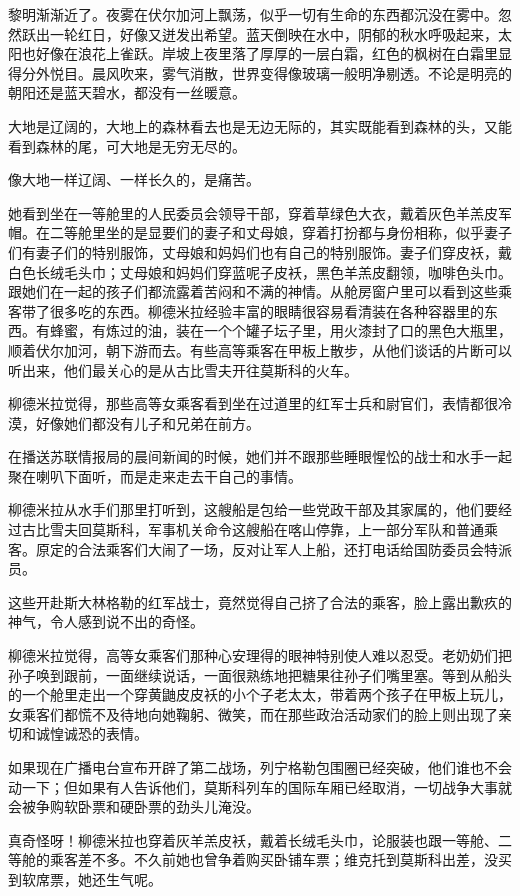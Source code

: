 黎明渐渐近了。夜雾在伏尔加河上飘荡，似乎一切有生命的东西都沉没在雾中。忽然跃出一轮红日，好像又迸发出希望。蓝天倒映在水中，阴郁的秋水呼吸起来，太阳也好像在浪花上雀跃。岸坡上夜里落了厚厚的一层白霜，红色的枫树在白霜里显得分外悦目。晨风吹来，雾气消散，世界变得像玻璃一般明净剔透。不论是明亮的朝阳还是蓝天碧水，都没有一丝暖意。

大地是辽阔的，大地上的森林看去也是无边无际的，其实既能看到森林的头，又能看到森林的尾，可大地是无穷无尽的。

像大地一样辽阔、一样长久的，是痛苦。

她看到坐在一等舱里的人民委员会领导干部，穿着草绿色大衣，戴着灰色羊羔皮军帽。在二等舱里坐的是显要们的妻子和丈母娘，穿着打扮都与身份相称，似乎妻子们有妻子们的特别服饰，丈母娘和妈妈们也有自己的特别服饰。妻子们穿皮袄，戴白色长绒毛头巾；丈母娘和妈妈们穿蓝呢子皮袄，黑色羊羔皮翻领，咖啡色头巾。跟她们在一起的孩子们都流露着苦闷和不满的神情。从舱房窗户里可以看到这些乘客带了很多吃的东西。柳德米拉经验丰富的眼睛很容易看清装在各种容器里的东西。有蜂蜜，有炼过的油，装在一个个罐子坛子里，用火漆封了口的黑色大瓶里，顺着伏尔加河，朝下游而去。有些高等乘客在甲板上散步，从他们谈话的片断可以听出来，他们最关心的是从古比雪夫开往莫斯科的火车。

柳德米拉觉得，那些高等女乘客看到坐在过道里的红军士兵和尉官们，表情都很冷漠，好像她们都没有儿子和兄弟在前方。

在播送苏联情报局的晨间新闻的时候，她们并不跟那些睡眼惺忪的战士和水手一起聚在喇叭下面听，而是走来走去干自己的事情。

柳德米拉从水手们那里打听到，这艘船是包给一些党政干部及其家属的，他们要经过古比雪夫回莫斯科，军事机关命令这艘船在喀山停靠，上一部分军队和普通乘客。原定的合法乘客们大闹了一场，反对让军人上船，还打电话给国防委员会特派员。

这些开赴斯大林格勒的红军战士，竟然觉得自己挤了合法的乘客，脸上露出歉疚的神气，令人感到说不出的奇怪。

柳德米拉觉得，高等女乘客们那种心安理得的眼神特别使人难以忍受。老奶奶们把孙子唤到跟前，一面继续说话，一面很熟练地把糖果往孙子们嘴里塞。等到从船头的一个舱里走出一个穿黄鼬皮皮袄的小个子老太太，带着两个孩子在甲板上玩儿，女乘客们都慌不及待地向她鞠躬、微笑，而在那些政治活动家们的脸上则出现了亲切和诚惶诚恐的表情。

如果现在广播电台宣布开辟了第二战场，列宁格勒包围圈已经突破，他们谁也不会动一下；但如果有人告诉他们，莫斯科列车的国际车厢已经取消，一切战争大事就会被争购软卧票和硬卧票的劲头儿淹没。

真奇怪呀！柳德米拉也穿着灰羊羔皮袄，戴着长绒毛头巾，论服装也跟一等舱、二等舱的乘客差不多。不久前她也曾争着购买卧铺车票；维克托到莫斯科出差，没买到软席票，她还生气呢。

